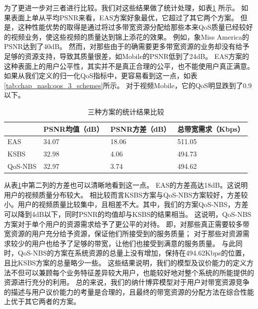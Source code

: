 为了更进一步对三者进行比较。我们对这些结果做了统计处理，如表\ref{tab:chap_nash:statis_three_schemes} 所示。
如果表面上单从平均PSNR来看，EAS方案好象最优，它超过了其它两个方案。
但是，这种性能优势的取得是通过将过多带宽资源分配给那些本来QoS质量已经较好的视频业务，使这些视频的质量达到锦上添花的效果。
例如，象Miss America的PSNR达到了40dB。
然而，对那些由于的确需要更多带宽资源的业务却没有给予足够的资源支持，导致其质量很差，如Mobile的PSNR低到了24dB。
EAS方案的这种表面上的用户公平性，其实并不是真正合理的公平，也不能使用户真正满意。
如果从我们定义的归一化QoS指标中，更容易看到这一点，如表\ref{tab:chap_nash:qos_3_schemes}所示。 
对于视频Mobile，它的QoS明显跌到了0.9以下。
\begin{table}[htbp]
    \wuhao
    \centering
    \caption{三种方案的统计结果比较}
    \begin{tabular*}{\textwidth}{ p{}p{}p{}p{}}
        \toprule
        & PSNR均值（dB） &PSNR方差（dB） &总带宽需求（Kbps） \\
        \midrule
        EAS & 34.07 & 18.06 & 511.05 \\
        KSBS &32.98 & 4.06 & 494.73 \\
        QoS-NBS & 32.97 & 3.74 & 494.62 \\
        \bottomrule
    \end{tabular*}
    \label{tab:chap_nash:statis_three_schemes}
\end{table}

从表\ref{tab:chap_nash:statis_three_schemes}中第二列的方差也可以清晰地看到这一点。
EAS的方差高达18dB。这说明用户的视频质量分布较大。
相比较而言KSBS方案与QoS-NBS方案较好，方差较小。用户的视频质量比较集中，且相差不大。其中，我们的方案QoS-NBS，方差可以降到4dB以下，同时PSNR的均值却与KSBS的结果相当。
这说明，QoS-NBS方案对于单个用户的资源需求给予了更公平的对待。
即，对那些真正需要较多带宽资源的用户充分给予资源，保证他们所接受到的服务质量；
对于那些对资源需求较少的用户也给予了足够的带宽，让他们也接受到满意的服务质量。
与此同时，QoS-NBS的方案在系统资源的总量上没有增加，保持在494.62Kbps的位置，且比KSBS方案的总量略少一些。
这些结果说明，我们的模型及议价能力的定义方法不但可以兼顾每个业务特征差异较大用户，也能较好地对整个系统的所能提供的资源进行充分的利用。
总的来说，我们的纳什博弈模型对于用户对带宽资源竞争的描述与用户议价能力的考量是合理的，且最终的带宽资源的分配方法在综合性能上优于其它两者的方案。

